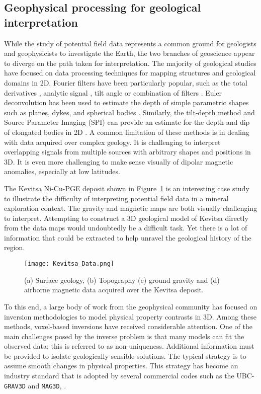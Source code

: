 \subsection{Geophysical processing for geological interpretation}
While the study of potential field data represents a common ground for geologists and geophysicists to investigate the Earth, the two branches of geoscience appear to diverge on the path taken for interpretation. The majority of geological studies have focused on data processing techniques for mapping structures and geological domains in 2D. Fourier filters have been particularly popular, such as the total derivatives \cite[]{Cordell2012}, analytic signal \cite[]{Roest92, Macleod1993}, tilt angle \cite[]{Miller1994} or combination of filters \cite[]{Verduzco2004, Sanchez2014}.
Euler deconvolution has been used to estimate the depth of simple parametric shapes such as planes, dykes, and spherical bodies \cite[]{Thompson82, Reid1990, Mushayendebvu01}. Similarly, the tilt-depth method \cite[]{Salem2007}and Source Parameter Imaging (SPI) \cite[]{Thurston1997} can provide an estimate for the depth and dip of elongated bodies in 2D \cite[]{Phillips2010}.
A common limitation of these methods is in dealing with data acquired over complex geology. It is challenging to interpret overlapping signals from multiple sources with arbitrary shapes and positions in 3D. It is even more challenging to make sense visually of dipolar magnetic anomalies, especially at low latitudes.

The Kevitsa Ni-Cu-PGE deposit shown in Figure~\ref{Kevitsa_data} is an interesting case study to illustrate the difficulty of interpreting potential field data in a mineral exploration context. The gravity and magnetic maps are both visually challenging to interpret. Attempting to construct a 3D geological model of Kevitsa directly from the data maps would undoubtedly be a difficult task. Yet there is a lot of information that could be extracted to help unravel the geological history of the region.
\begin{figure}[h!]
\texttt{[image: Kevitsa\_Data.png]}
\caption{(a) Surface geology, (b) Topography (c) ground gravity and (d) airborne magnetic data acquired over the Kevitsa deposit.}
\label{Kevitsa_data}
\end{figure}

To this end, a large body of work from the geophysical community has focused on inversion methodologies to model physical property contrasts in 3D. Among these methods, voxel-based inversions have received considerable attention. One of the main challenges posed by the inverse problem is that many models can fit the observed data; this is referred to as non-uniqueness. Additional information must be provided to isolate geologically sensible solutions. The typical strategy is to assume smooth changes in physical properties. This strategy has become an industry standard that is adopted by several commercial codes such as the UBC-\texttt{GRAV3D} and \texttt{MAG3D}, \cite[]{LiOldenburg1996, LiOldenburg1998}.

